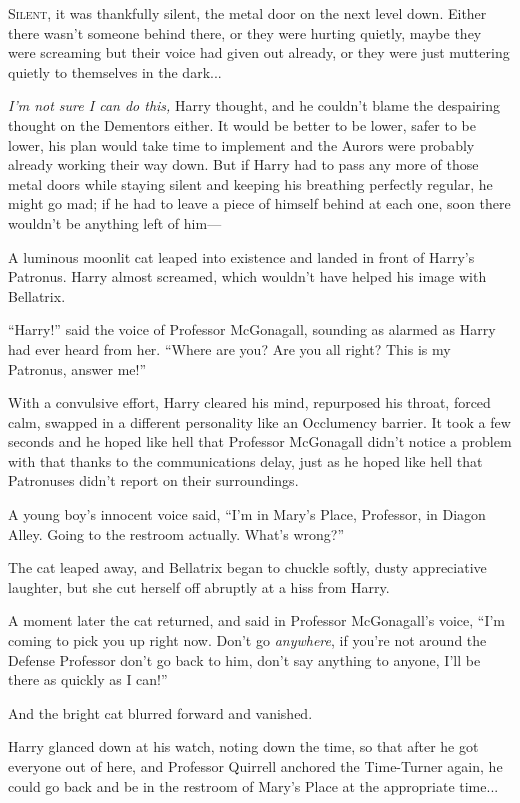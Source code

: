 \lettrine{S}{ilent,} it was thankfully silent, the metal door on the next level down. Either there wasn’t someone behind there, or they were hurting quietly, maybe they were screaming but their voice had given out already, or they were just muttering quietly to themselves in the dark...

\emph{I’m not sure I can do this,} Harry thought, and he couldn’t blame the despairing thought on the Dementors either. It would be better to be lower, safer to be lower, his plan would take time to implement and the Aurors were probably already working their way down. But if Harry had to pass any more of those metal doors while staying silent and keeping his breathing perfectly regular, he might go mad; if he had to leave a piece of himself behind at each one, soon there wouldn’t be anything left of him—

A luminous moonlit cat leaped into existence and landed in front of Harry’s Patronus. Harry almost screamed, which wouldn’t have helped his image with Bellatrix.

“Harry!” said the voice of Professor McGonagall, sounding as alarmed as Harry had ever heard from her. “Where are you? Are you all right? This is my Patronus, answer me!”

With a convulsive effort, Harry cleared his mind, repurposed his throat, forced calm, swapped in a different personality like an Occlumency barrier. It took a few seconds and he hoped like hell that Professor McGonagall didn’t notice a problem with that thanks to the communications delay, just as he hoped like hell that Patronuses didn’t report on their surroundings.

A young boy’s innocent voice said, “I’m in Mary’s Place, Professor, in Diagon Alley. Going to the restroom actually. What’s wrong?”

The cat leaped away, and Bellatrix began to chuckle softly, dusty appreciative laughter, but she cut herself off abruptly at a hiss from Harry.

A moment later the cat returned, and said in Professor McGonagall’s voice, “I’m coming to pick you up right now. Don’t go \emph{anywhere}, if you’re not around the Defense Professor don’t go back to him, don’t say anything to anyone, I’ll be there as quickly as I can!”

And the bright cat blurred forward and vanished.

Harry glanced down at his watch, noting down the time, so that after he got everyone out of here, and Professor Quirrell anchored the Time-Turner again, he could go back and be in the restroom of Mary’s Place at the appropriate time...

